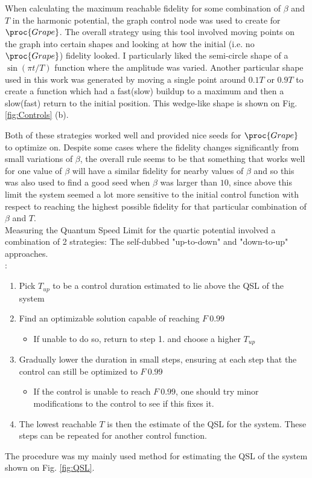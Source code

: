 \documentclass[aps,pra,reprint,superscriptaddress]{revtex4-1}
\begin{document}
When calculating the maximum reachable fidelity for some combination of $\beta$ and $T$ in the harmonic potential, the graph control node was used to create for $\proc{Grape}$. The overall strategy using this tool involved moving points on the graph into certain shapes and looking at how the initial (i.e. no $\proc{Grape}$) fidelity looked. I particularly liked the semi-circle shape of a $\sin(\pi t/T)$ function where the amplitude was varied. Another particular shape used in this work was generated by moving a single point around $0.1T$ or $0.9T$ to create a function which had a fast(slow) buildup to a maximum and then a slow(fast) return to the initial position. This wedge-like shape is shown on Fig. \ref{fig:Controls} (b).

Both of these strategies worked well and provided nice seeds for $\proc{Grape}$ to optimize on. Despite some cases where the fidelity changes significantly from small variations of $\beta$, the overall rule seems to be that something that works well for one value of $\beta$ will have a similar fidelity for nearby values of $\beta$ and so this was also used to find a good seed when $\beta$ was larger than $10$, since above this limit the system seemed a lot more sensitive to the initial control function with respect to reaching the highest possible fidelity for that particular combination of $\beta$ and $T$. \\

Measuring the Quantum Speed Limit for the quartic potential involved a combination of 2 strategies: The self-dubbed "up-to-down" and "down-to-up" approaches. \\

:
\begin{enumerate}
	\item Pick $T_{up}$ to be a control duration estimated to lie above the QSL of the system
	\item Find an optimizable solution capable of reaching $F~0.99$
	\begin{itemize}
		\item If unable to do so, return to step 1. and choose a higher $T_{up}$
	\end{itemize}
	\item Gradually lower the duration in small steps, ensuring at each step that the control can still be optimized to $F~0.99$
	\begin{itemize}
		\item If the control is unable to reach $F~0.99$, one should try minor modifications to the control to see if this fixes it.
	\end{itemize}
	\item The lowest reachable $T$ is then the estimate of the QSL for the system. These steps can be repeated for another control function.
\end{enumerate}
The  procedure was my mainly used method for estimating the QSL of the system shown on Fig. \ref{fig:QSL}.\\
\end{document}

